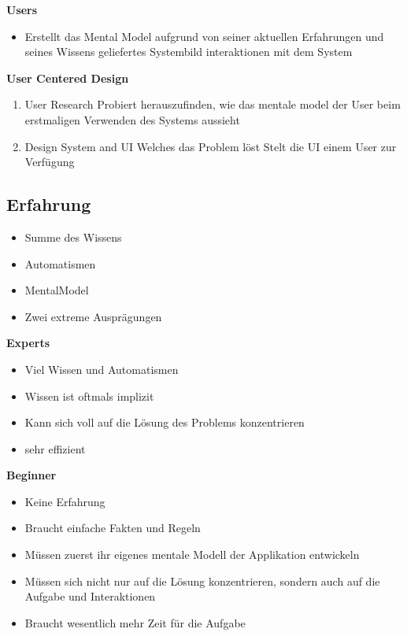 \documentclass{report}
\theoremstyle{definition}
\theoremstyle{example}
\begin{document}
\textbf{Users}
\begin{itemize}
   \item Erstellt das Mental Model aufgrund von
   \subitem seiner aktuellen Erfahrungen und seines Wissens
   \subitem geliefertes Systembild
   \subitem interaktionen mit dem System 
\end{itemize}

\textbf{User Centered Design}
\begin{enumerate}
   \item User Research
   \subitem Probiert herauszufinden, wie das mentale model der User beim erstmaligen Verwenden des Systems aussieht 
   \item Design System and UI
   \subitem Welches das Problem löst
   \subitem Stelt die UI einem User zur Verfügung 
\end{enumerate}

\subsection{Erfahrung}
\begin{itemize}
   \item Summe des Wissens
   \item Automatismen
   \item MentalModel
   \item Zwei extreme Ausprägungen
\end{itemize}

\textbf{Experts}
\begin{itemize}
   \item Viel Wissen und Automatismen
   \item Wissen ist oftmals implizit
   \item Kann sich voll auf die Lösung des Problems konzentrieren
   \item sehr effizient
\end{itemize}

\textbf{Beginner}
\begin{itemize}
   \item Keine Erfahrung
   \item Braucht einfache Fakten und Regeln
   \item Müssen zuerst ihr eigenes mentale Modell der Applikation entwickeln
   \item Müssen sich nicht nur auf die Lösung konzentrieren, sondern auch auf die Aufgabe und Interaktionen
   \item Braucht wesentlich mehr Zeit für die Aufgabe
\end{itemize}
\end{document}
